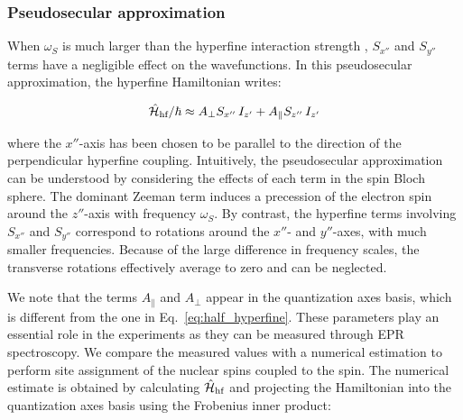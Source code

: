 \subsubsection{Pseudosecular approximation} 

When $\omega_S$ is much larger than the hyperfine interaction strength 
, $S_{x''}$ and $S_{y''}$ terms have a negligible effect on the wavefunctions. In this pseudosecular approximation, the hyperfine Hamiltonian writes:

\begin{align}
\begin{split}
    \hat{\mathcal{H}}_{\text{hf}} / \hbar \approx A_\perp  S_{x''}\,I_{z'} + A_\parallel  S_{z''}\,I_{z'}
\end{split}
\end{align}

\noindent where the ${x''}$-axis has been chosen to be parallel to the direction of the perpendicular hyperfine coupling. Intuitively, the pseudosecular approximation can be understood by considering the effects of each term in the \Er spin Bloch sphere. The dominant Zeeman term induces a precession of the electron spin around the ${z''}$-axis with frequency $\omega_S$. By contrast, the hyperfine terms involving $S_{x''}$ and $S_{y''}$ correspond to rotations around the ${x''}$- and ${y''}$-axes, with much smaller frequencies. Because of the large difference in frequency scales, the transverse rotations effectively average to zero and can be neglected.

We note that the terms $A_\parallel$ and $A_\perp$ appear in the quantization axes basis, which is different from the one in Eq.~\ref{eq:half_hyperfine}. These parameters play an essential role in the experiments as they can be measured through EPR spectroscopy. We compare the measured values with a numerical estimation to perform site assignment of the nuclear spins coupled to the \Er spin. The numerical estimate is obtained by calculating $\hat{\mathcal{H}}_{\text{hf}}$ and projecting the Hamiltonian into the quantization axes basis using the Frobenius inner product:


